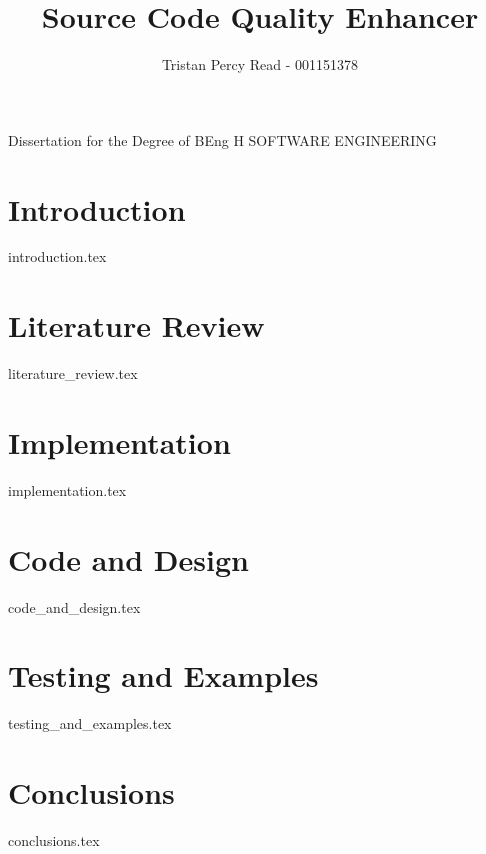 \documentclass{COMPXXXX} %
\begin{document}

\title{Source Code Quality Enhancer} %
\author{Tristan Percy Read - 001151378} %

\maketitle %
{
	\centering
	Dissertation for the Degree of BEng H SOFTWARE ENGINEERING

} %

\section*{Introduction}
{introduction.tex}

\section*{Literature Review}
{literature_review.tex}

\section*{Implementation}
{implementation.tex}

\section*{Code and Design}
{code_and_design.tex}

\section*{Testing and Examples}
{testing_and_examples.tex}

\section*{Conclusions}
{conclusions.tex}


% 
\end{document}
